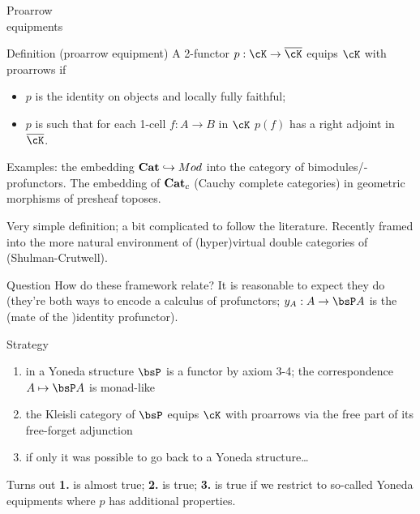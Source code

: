 \documentclass{beamer}
\begin{document}
\begin{frame}
	\Huge\centering Proarrow \\ equipments
\end{frame}
\begin{frame}
	\begin{block}{Definition (proarrow equipment)}
		A 2-functor $p : \cK \to \overline{\cK}$ \alert{equips $\cK$ with proarrows} if
		\begin{itemize}
			\item $p$ is the identity on objects and locally fully faithful;
			\item $p$ is such that for each 1-cell $f : A\to B$ in $\cK$ $p(f)$ has a right adjoint in $\overline{\cK}$.
		\end{itemize}
	\end{block}
	\bigskip{}
	Examples: the embedding $\mathbf{Cat} \hookrightarrow Mod$ into the category of bimodules\fshyp{}profunctors. The embedding of $\mathbf{Cat}_c$ (Cauchy complete categories) in geometric morphisms of presheaf toposes.

	\bigskip{}
	\begin{block}{}
		Very simple definition; a bit complicated to follow the literature. Recently framed into the more natural environment of \alert{(hyper)virtual double categories} of (Shulman-Crutwell).
	\end{block}
\end{frame}
\begin{frame}
	\begin{block}{Question}
		How do these framework relate? It is reasonable to expect they do (they're both ways to encode a calculus of profunctors; $y_A : A\to \bsP A$ is the \alert{(mate of the )identity profunctor}).
	\end{block}
\end{frame}
\begin{frame}
	\begin{block}{Strategy}
		\begin{enumerate}
			\item in a Yoneda structure $\bsP$ is a functor by axiom 3-4; the correspondence $A\mapsto \bsP A$ is \alert{monad-like}
			\item<2-> \alert{the Kleisli category of $\bsP$ equips $\cK$ with proarrows via the free part of its free-forget adjunction}
			\item<3-> if only it was possible to go back to a Yoneda structure\dots
		\end{enumerate}
	\end{block}
	\bigskip
	Turns out	\textbf{1.} is almost true; \textbf{2.} is true; \textbf{3.} is true if we restrict to so-called \alert{Yoneda equipments} where $p$ has additional properties.
\end{frame}
\end{document}
